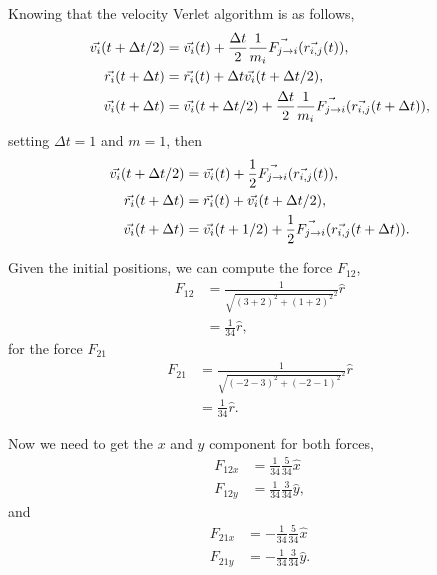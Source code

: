 \documentclass[main.tex]{subfiles}
\begin{document}
Knowing that the velocity Verlet algorithm is as follows,
\begin{align}
    \vec{v_{i}}\qty(t+\Delta t/2) &= \vec{v_{i}}\qty(t) + \frac{\Delta t}{2}\frac{1}{m_{i}}\vec{F_{j\to i}}\qty(\vec{r_{i,j}}\qty(t)), \\
    \vec{r_{i}}\qty(t+\Delta t) &= \vec{r_{i}}\qty(t) + \Delta t \vec{v_{i}}\qty(t+\Delta t/2), \\
    \vec{v_{i}}\qty(t+\Delta t) &= \vec{v_{i}}\qty(t+\Delta t/2) + \frac{\Delta t}{2}\frac{1}{m_{i}}\vec{F_{j\to i}}\qty(\vec{r_{i,j}}\qty(t+\Delta t)),
\end{align}
setting $\Delta t = 1$ and $m=1$, then
\begin{align}
    \vec{v_{i}}\qty(t+\Delta t/2) &= \vec{v_{i}}\qty(t) + \frac{1}{2}\vec{F_{j\to i}}\qty(\vec{r_{i,j}}\qty(t))\label{eqn1:vmid}, \\
    \vec{r_{i}}\qty(t+\Delta t) &= \vec{r_{i}}\qty(t) + \vec{v_{i}}\qty(t+\Delta t/2)\label{eqn1:r}, \\
    \vec{v_{i}}\qty(t+\Delta t) &= \vec{v_{i}}\qty(t+1/2) + \frac{1}{2}\vec{F_{j\to i}}\qty(\vec{r_{i,j}}\qty(t+\Delta t))\label{eqn1:v}.
\end{align}

Given the initial positions, we can compute the force $F_{12}$,
\begin{align*}
    F_{12} &= \frac{1}{\sqrt{ (3+2)^{2} + (1+2)^{2} }^{2}}\hat{r} \\
    &= \frac{1}{34}\hat{r},
\end{align*}
for the force $F_{21}$
\begin{align*}
    F_{21} &= \frac{1}{\sqrt{ (-2-3)^{2} + (-2-1)^{2} }^{2}}\hat{r} \\
    &= \frac{1}{34}\hat{r}.
\end{align*}

Now we need to get the $x$ and $y$ component for both forces,
\begin{align*}
    F_{12x} &= \frac{1}{34}\frac{5}{34}\hat{x} \\
    F_{12y} &= \frac{1}{34}\frac{3}{34}\hat{y},
\end{align*}
and
\begin{align*}
    F_{21x} &= -\frac{1}{34}\frac{5}{34}\hat{x} \\
    F_{21y} &= -\frac{1}{34}\frac{3}{34}\hat{y}.
\end{align*}
\end{document}
